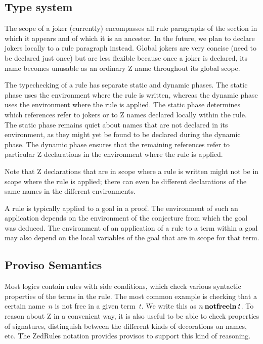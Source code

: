 \documentclass{entcs}
\begin{document}
\subsection{Type system}

The scope of a joker (currently) encompasses all rule paragraphs of
the section in which it appears and of which it is an ancestor.  In
the future, we plan to declare jokers locally to a rule paragraph
instead.  Global jokers are very concise (need to be declared just
once) but are less flexible because once a joker is declared, its name
becomes unusable as an ordinary Z name throughout its global scope.

The typechecking of a rule has separate static and dynamic phases.
The static phase uses the environment where the rule is written,
whereas the dynamic phase uses the environment where the rule is
applied.  The static phase determines which references refer to jokers
or to Z names declared locally within the rule.  The static phase
remains quiet about names that are not declared in its environment, as
they might yet be found to be declared during the dynamic phase.  The
dynamic phase ensures that the remaining references refer to
particular Z declarations in the environment where the rule is
applied.

Note that Z declarations that are in scope where a rule is written
might not be in scope where the rule is applied; there can even be
different declarations of the same names in the different
environments.

A rule is typically applied to a goal in a proof.  The environment of
such an application depends on the environment of the conjecture from
which the goal was deduced.  The environment of an application of a
rule to a term within a goal may also depend on the local variables of
the goal that are in scope for that term.

\subsection{Proviso Semantics}

Most logics contain rules with side conditions, which check various
syntactic properties of the terms in the rule.  The most common
example is checking that a certain name~$n$ is not free in a given
term~$t$.  We write this as $n \mathbin{\mathop{\mathstrut{\mbox{\textbf{notfreein}}}}\nolimits} t$.  To reason about Z in a
convenient way, it is also useful to be able to check properties of
signatures, distinguish between the different kinds of decorations on
names, etc.  The ZedRules notation provides provisos to support this
kind of reasoning.
\end{document}
